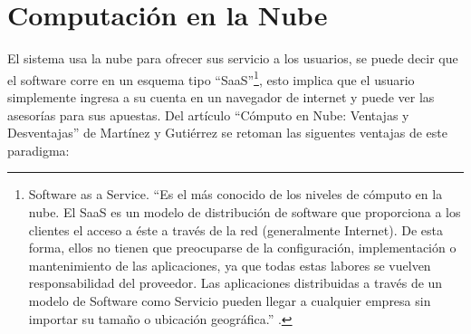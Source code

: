  \section{Computación en la Nube}

El sistema usa la nube para ofrecer sus servicio a los usuarios, se puede decir que el software corre en un esquema tipo ``SaaS''\footnote{Software as a Service. ``Es el más conocido de los niveles de cómputo en la nube. El SaaS es un modelo de distribución de software que proporciona a los clientes el acceso a éste a través de la red (generalmente Internet). De esta forma, ellos no tienen que preocuparse de la configuración, implementación o mantenimiento de las aplicaciones, ya que todas estas labores se vuelven responsabilidad del proveedor. Las aplicaciones distribuidas a través de un modelo de Software como Servicio pueden llegar a cualquier empresa sin importar su tamaño o ubicación geográfica.'' \cite{computoNube}.}, esto implica que el usuario simplemente ingresa a su cuenta en un navegador de internet y puede ver las asesorías para sus apuestas.  
Del artículo ``Cómputo en Nube: Ventajas y Desventajas'' de Martínez y Gutiérrez \cite{computoNube}  se retoman las siguentes ventajas de este paradigma:
